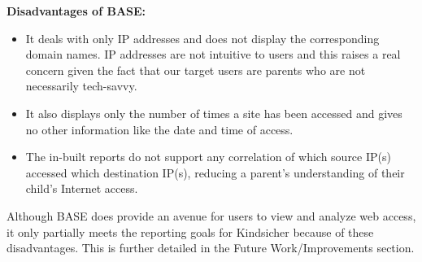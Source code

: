 \textbf{Disadvantages of BASE:}
\begin{itemize}

\item It deals with only IP addresses and does not display the
  corresponding domain names.
  IP addresses are not intuitive to users and this raises a real
  concern given the fact that our target users are parents who are not
  necessarily tech-savvy.

\item It also displays only the number of times a site has been
  accessed and gives no other information like the date and time of
  access.

\item The in-built reports do not support any correlation of which
  source IP(s) accessed which destination IP(s), reducing a parent's
  understanding of their child's Internet access.

\end{itemize}

Although BASE does provide an avenue for users to view and analyze web
access, it only partially meets the reporting goals for
Kindsicher because of these disadvantages.
%
This is further detailed in the Future Work/Improvements section.
%



